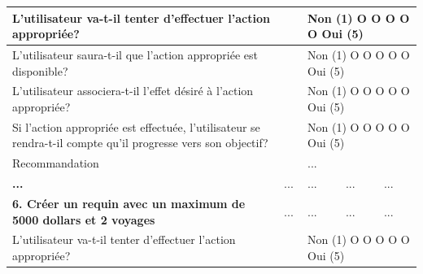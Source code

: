 \documentclass{article}
\begin{document}
\begin{table}[h]
\begin{tabular}{|p{6cm}|p{1.5cm}|p{1.5cm}|p{2.5cm}|p{3.5cm}|}
		\multicolumn{2}{|p{7.5cm}|}{L’utilisateur va-t-il tenter d’effectuer l’action appropriée?}                                                & \multicolumn{3}{p{7.5cm}|}{Non (1) O O O O O Oui (5)}                                                                                       \\ \hline
		\multicolumn{2}{|p{7.5cm}|}{L’utilisateur saura-t-il que l’action appropriée est disponible?}                                             & \multicolumn{3}{p{7.5cm}|}{Non (1) O O O O O Oui (5)}                                                                                       \\ \hline
		\multicolumn{2}{|p{7.5cm}|}{L’utilisateur associera-t-il l’effet désiré à l’action appropriée?}                                           & \multicolumn{3}{p{7.5cm}|}{Non (1) O O O O O Oui (5)}                                                                                       \\ \hline
		\multicolumn{2}{|p{7.5cm}|}{Si l’action appropriée est effectuée, l’utilisateur se rendra-t-il compte qu’il progresse vers son objectif?} & \multicolumn{3}{p{7.5cm}|}{Non (1) O O O O O Oui (5)}                                                                                       \\ \hline
		\multicolumn{2}{|p{7.5cm}|}{Recommandation}                                                                                               & \multicolumn{3}{p{7.5cm}|}{...}                                                                                                             \\ \hline
		\textbf{...}                                                                                                                              & ...                                                   & ...              & ...                                      & ...                   \\ \hline
		\textbf{6. Créer un requin avec un maximum de 5000 dollars et 2 voyages}                                                                  & ...                                                   & ...              & ...                                      & ...                   \\ \hline
		\multicolumn{2}{|p{7.5cm}|}{L’utilisateur va-t-il tenter d’effectuer l’action appropriée?}                                                & \multicolumn{3}{p{7.5cm}|}{Non (1) O O O O O Oui (5)}                                                                                       \\ \hline

\end{tabular}
\end{table}
\end{document}
